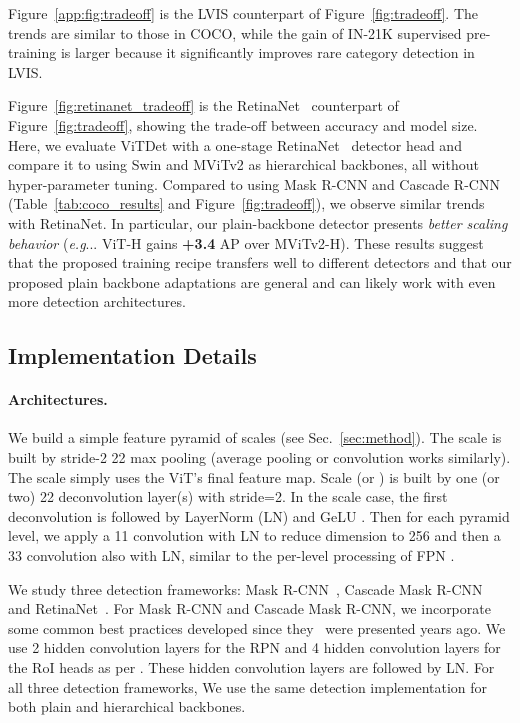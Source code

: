 \documentclass[runningheads]{llncs}
\makeatletter
\DeclareRobustCommand\onedot{\futurelet\@let@token\@onedot}
\def\@onedot{\ifx\@let@token.\else.\null\fi\xspace}
\def\eg{\emph{e.g}\onedot} \def\Eg{\emph{E.g}\onedot}
\newcommand{\boxAP}{AP\xspace}
\makeatother
\begin{document}
Figure~\ref{app:fig:tradeoff} is the LVIS counterpart of Figure~\ref{fig:tradeoff}. The trends are similar to those in COCO, while the gain of IN-21K supervised pre-training is larger because it significantly improves rare category detection in LVIS.

Figure~\ref{fig:retinanet_tradeoff} is the RetinaNet~\cite{Lin2017a} counterpart of Figure~\ref{fig:tradeoff}, showing the trade-off between accuracy and model size. Here, we evaluate ViTDet with a one-stage RetinaNet~\cite{Lin2017a} detector head and compare it to using Swin and MViTv2 as hierarchical backbones, all without hyper-parameter tuning. Compared to using Mask R-CNN and Cascade R-CNN (Table~\ref{tab:coco_results} and Figure~\ref{fig:tradeoff}), we observe similar trends with RetinaNet. In particular, our plain-backbone detector presents \emph{better scaling behavior} (\eg. ViT-H gains \textbf{+3.4} \boxAP over MViTv2-H). These results suggest that the proposed training recipe transfers well to different detectors and that our proposed plain backbone adaptations are general and can likely work with even more detection architectures. 

    
\subsection{Implementation Details} \label{app:sec:details}

\paragraph{Architectures.}
We build a simple feature pyramid of scales  (see Sec.~\ref{sec:method}). The  scale is built by stride-2 22 max pooling (average pooling or convolution works similarly). The  scale simply uses the ViT's final feature map. Scale  (or ) is built by one (or two) 22 deconvolution layer(s) with stride=2. In the  scale case, the first deconvolution is followed by LayerNorm (LN)  and GeLU . Then for each pyramid level, we apply a 11 convolution with LN to reduce dimension to 256 and then a 33 convolution also with LN, similar to the per-level processing of FPN \cite{Lin2017}.

We study three detection frameworks: Mask R-CNN~\cite{He2017}, Cascade Mask R-CNN~\cite{Cai2019} and RetinaNet~\cite{Lin2017a}. For Mask R-CNN and Cascade Mask R-CNN, we incorporate some common best practices developed since they~\cite{He2017,Cai2019} were presented years ago. We use 2 hidden convolution layers for the RPN and 4 hidden convolution layers for the RoI heads as per . These hidden convolution layers are followed by LN. For all three detection frameworks, We use the same detection implementation for both plain and hierarchical backbones.
\end{document}
